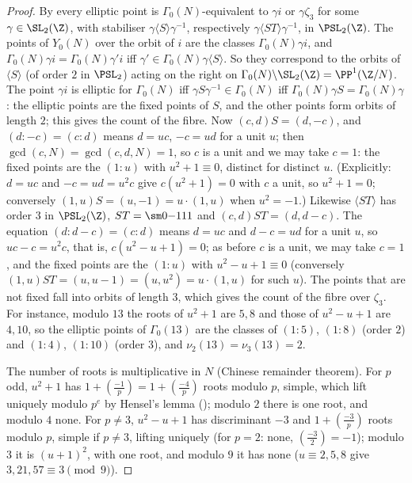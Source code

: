 \begin{proof}
By  every elliptic point is $\Gamma_0(N)$-equivalent to $\gamma i$ or $\gamma\zeta_3$ for some $\gamma\in\SL_2(\Z)$, with stabiliser
$\gamma\langle S\rangle\gamma^{-1}$, respectively $\gamma\langle ST\rangle\gamma^{-1}$, in $\PSL_2(\Z)$. The points of $Y_0(N)$ over the orbit of $i$ are the classes $\Gamma_0(N)\gamma i$, and
$\Gamma_0(N)\gamma i=\Gamma_0(N)\gamma'i$ iff $\gamma'\in\Gamma_0(N)\gamma\langle S\rangle$. So they correspond to the orbits of $\langle S\rangle$ (of order $2$ in $\PSL_2$) acting on the right on
$\Gamma_0(N)\backslash\SL_2(\Z)=\PP^1(\Z/N)$. The point $\gamma i$ is elliptic for $\Gamma_0(N)$ iff $\gamma S\gamma^{-1}\in\Gamma_0(N)$ iff $\Gamma_0(N)\gamma S=\Gamma_0(N)\gamma$: the elliptic points
are the fixed points of $S$, and the other points form orbits of length $2$; this gives the count of the fibre. Now $(c,d)S=(d,-c)$, and $(d:-c)=(c:d)$ means
$d=uc$, $-c=ud$ for a unit $u$; then $\gcd(c,N)=\gcd(c,d,N)=1$, so $c$ is a unit and we may take $c=1$: the fixed points are the $(1:u)$ with $u^2+1\equiv0$,
distinct for distinct $u$. (Explicitly: $d=uc$ and $-c=ud=u^2c$ give $c(u^2+1)=0$ with $c$ a unit, so $u^2+1=0$; conversely $(1,u)S=(u,-1)=u\cdot(1,u)$ when $u^2=-1$.)
Likewise $\langle ST\rangle$ has order $3$ in $\PSL_2(\Z)$, $ST=\sm0{-1}11$ and $(c,d)ST=(d,d-c)$. The equation $(d:d-c)=(c:d)$ means $d=uc$ and $d-c=ud$ for a unit $u$, so
$uc-c=u^2c$, that is, $c(u^2-u+1)=0$; as before $c$ is a unit, we may take $c=1$, and the fixed points are the $(1:u)$ with $u^2-u+1\equiv0$ (conversely
$(1,u)ST=(u,u-1)=(u,u^2)=u\cdot(1,u)$ for such $u$). The points that are not fixed fall into orbits of length $3$, which gives the count of the fibre over $\zeta_3$. For instance, modulo $13$
the roots of $u^2+1$ are $5,8$ and those of $u^2-u+1$ are $4,10$, so the elliptic points of $\Gamma_0(13)$ are the classes of $(1:5)$, $(1:8)$ (order $2$) and $(1:4)$, $(1:10)$
(order $3$), and $\nu_2(13)=\nu_3(13)=2$.

The number of roots is multiplicative in $N$ (Chinese remainder theorem). For $p$ odd, $u^2+1$ has $1+(\frac{-1}p)=1+(\frac{-4}p)$ roots modulo $p$, simple, which lift
uniquely modulo $p^e$ by Hensel's lemma (); modulo $2$ there is one root, and modulo $4$ none. For $p\ne3$, $u^2-u+1$ has discriminant $-3$ and
$1+(\frac{-3}p)$ roots modulo $p$, simple if $p\ne3$, lifting uniquely (for $p=2$: none, $(\frac{-3}2)=-1$); modulo $3$ it is $(u+1)^2$, with one root, and modulo
$9$ it has none ($u\equiv2,5,8$ give $3,21,57\equiv3\pmod9$).
\end{proof}

